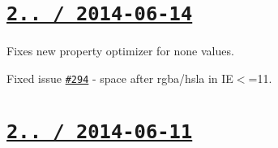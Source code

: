 \section*{\href{https://github.com/jakubpawlowicz/clean-css/compare/v2.2.0...v2.2.1}{\tt 2.. / 2014-\/06-\/14} }


\begin{DoxyItemize}
\item Fixes new property optimizer for \textquotesingle{}none\textquotesingle{} values.
\item Fixed issue \href{https://github.com/jakubpawlowicz/clean-css/issues/294}{\tt \#294} -\/ space after {\ttfamily rgba}/{\ttfamily hsla} in IE$<$=11.
\end{DoxyItemize}

\section*{\href{https://github.com/jakubpawlowicz/clean-css/compare/v2.1.8...v2.2.0}{\tt 2.. / 2014-\/06-\/11} }


